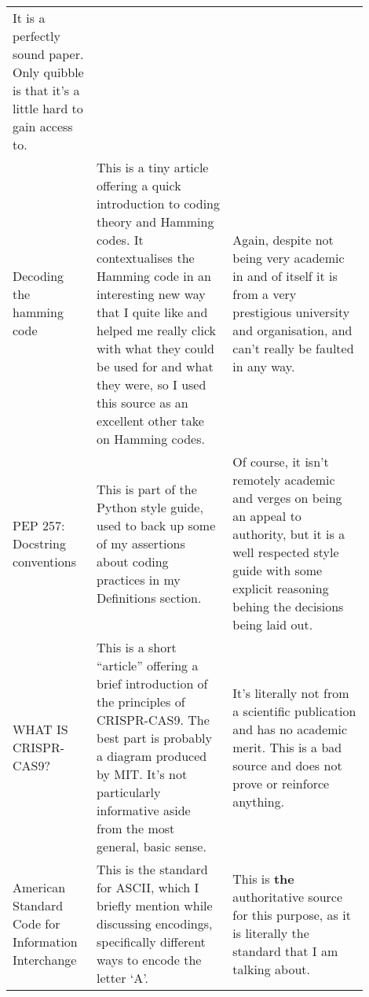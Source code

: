 \documentclass[a4paper,11pt]{article}
\begin{document}
\begin{center}
{\begin{longtable}{p{0.2\linewidth} p{0.35\linewidth} p{0.35\linewidth}}
    It is a perfectly sound paper. Only quibble is that it's a little hard to
    gain access to.

    \\

    Decoding the hamming code \cite{DecodingHamming2006Eherenborg} &

    This is a tiny article offering a quick introduction to coding theory and
    Hamming codes. It contextualises the Hamming code in an interesting new way
    that I quite like and helped me really click with what they could be used
    for and what they were, so I used this source as an excellent other take on
    Hamming codes. &

    Again, despite not being very academic in and of itself it is from a very
    prestigious university and organisation, and can't really be faulted in any
    way.

    \\

    PEP 257: Docstring conventions \cite{PEPDocstrings2014Goodger} &

    This is part of the Python style guide, used to back up some of my
    assertions about coding practices in my Definitions section. &

    Of course, it isn't remotely academic and verges on being an appeal to
    authority, but it is a well respected style guide with some explicit
    reasoning behing the decisions being laid out.

    \\

    WHAT IS CRISPR-CAS9? \cite{CRISPRDailymail} &

    This is a short ``article'' offering a brief introduction of the principles
    of CRISPR-CAS9. The best part is probably a diagram produced by MIT. It's
    not particularly informative aside from the most general, basic sense. &

    It's literally not from a scientific publication and has no academic merit.
    This is a bad source and does not prove or reinforce anything.

    \\

    American Standard Code for Information Interchange \cite{ASCII1963ASA} &

    This is the standard for ASCII, which I briefly mention while discussing
    encodings, specifically different ways to encode the letter `A'. &

    This is \textbf{the} authoritative source for this purpose, as it is
    literally the standard that I am talking about.  \\


\end{longtable}}
\end{center}
\end{document}
